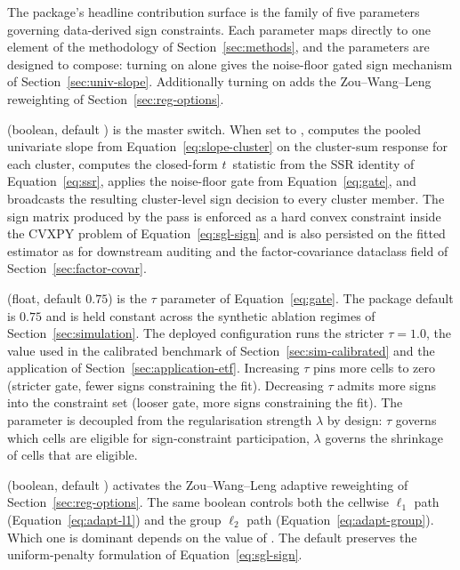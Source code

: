 \documentclass[article]{jss}
\begin{document}
The package's headline contribution surface is the family of five
parameters governing data-derived sign constraints. Each parameter
maps directly to one element of the methodology of
Section~\ref{sec:methods}, and the parameters are designed to compose:
turning on  alone gives the noise-floor
gated sign mechanism of Section~\ref{sec:univ-slope}. Additionally
turning on  adds the
Zou--Wang--Leng reweighting of Section~\ref{sec:reg-options}.

 (boolean, default ) is the
master switch. When set to ,  computes
the pooled univariate slope from Equation~\ref{eq:slope-cluster} on
the cluster-sum response for each cluster, computes the closed-form
$t$~statistic from the SSR identity of Equation~\ref{eq:ssr}, applies
the noise-floor gate from Equation~\ref{eq:gate}, and broadcasts the
resulting cluster-level sign decision to every cluster member. The
sign matrix produced by the pass is enforced as a hard convex
constraint inside the CVXPY problem of Equation~\ref{eq:sgl-sign} and
is also persisted on the fitted estimator as 
for downstream auditing and the factor-covariance dataclass field of
Section~\ref{sec:factor-covar}.

 (float, default $0.75$) is the
$\tau$ parameter of Equation~\ref{eq:gate}. The package default is
$0.75$ and is held constant across the synthetic ablation regimes of
Section~\ref{sec:simulation}. The deployed configuration runs the
stricter $\tau = 1.0$, the value used in the calibrated benchmark of
Section~\ref{sec:sim-calibrated} and the application of
Section~\ref{sec:application-etf}.
Increasing $\tau$ pins more cells to zero (stricter gate, fewer signs
constraining the fit). Decreasing $\tau$ admits more signs into the
constraint set (looser gate, more signs constraining the fit). The
parameter is decoupled from the regularisation strength $\lambda$ by
design: $\tau$ governs which cells are eligible for sign-constraint
participation, $\lambda$ governs the shrinkage of cells that are
eligible.

 (boolean, default )
activates the Zou--Wang--Leng adaptive reweighting of
Section~\ref{sec:reg-options}. The same boolean controls both the
cellwise $\ell_1$ path (Equation~\ref{eq:adapt-l1}) and the group $\ell_2$ path
(Equation~\ref{eq:adapt-group}). Which one is dominant depends on the
value of . The default  preserves the
uniform-penalty formulation of Equation~\ref{eq:sgl-sign}.
\end{document}
